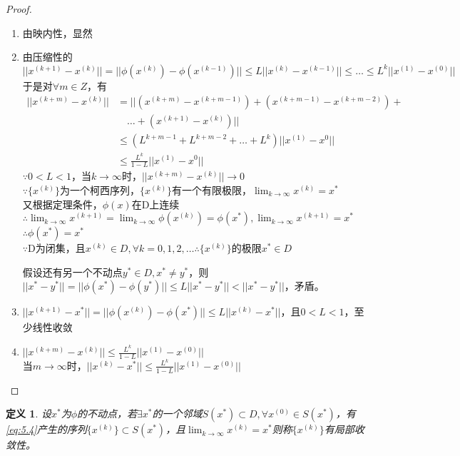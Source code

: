 \documentclass[a4paper]{article}
\newtheorem{definition}{定义}[section]
\begin{document}
\begin{proof}
    \begin{enumerate}
        \item 由映内性，显然
        \item 由压缩性的$||x^{(k+1)}-x^{(k)}||=||\phi(x^{(k)})-\phi(x^{(k-1)})||\le L||x^{(k)}-x^{(k-1)}||\le \dots \le L^k||x^{(1)}-x^{(0)} ||$\\
        于是对$\forall m \in Z$，有
        \begin{equation*}
            \begin{split}
                ||x^{(k+m)}-x^{(k)}|| &= ||(x^{(k+m)}-x^{(k+m-1)})+(x^{(k+m-1)}-x^{(k+m-2)})+\\
                &\quad \dots + (x^{(k+1)}-x^{(k)}) ||\\
                &\le (L^{k+m-1}+L^{k+m-2}+\dots+L^k)||x^{(1)}-x^{0}|| \\
                &\le \frac{L^k}{1-L}||x^{(1)}-x^{0}||
            \end{split}
        \end{equation*}
        $\because 0<L<1$，当$k\rightarrow\infty$时，$||x^{(k+m)}-x^{(k)}||\rightarrow 0$\\
        $\because \{x^{(k)} \}$为一个柯西序列，$\{x^{(k)} \}$有一个有限极限，$\lim_{k\rightarrow\infty}x^{(k)}=x^* $\\
        又根据定理条件，$\phi(x)$在D上连续$\therefore \lim_{k\rightarrow \infty}x^{(k+1)}=\lim_{k\rightarrow \infty}\phi(x^{(k)})=\phi(x^*), \lim_{k\rightarrow \infty}x^{(k+1)}=x^* $\\
        $\therefore \phi(x^*)=x^* $\\
        $\because$D为闭集，且$x^{(k)}\in D, \forall k=0,1,2,\dots \therefore \{x^{(k)} \}$的极限$x^*\in D$

        假设还有另一个不动点$y^*\in D, x^*\neq y^*$，则$||x^*-y^*||=||\phi(x^*)-\phi(y^*) ||\le L||x^*-y^*||<||x^*-y^*||$，矛盾。
        \item $||x^{(k+1)}-x^*||=||\phi(x^{(k)})-\phi(x^*) ||\le L||x^{(k)}-x^*||$，且$0<L<1$，至少线性收敛
        \item $||x^{(k+m)}-x^{(k)}||\le \frac{L^k}{1-L}||x^{(1)}-x^{(0)}||$\\
            当$m\rightarrow\infty$时，$||x^{(k)}-x^*||\le \frac{L^k}{1-L}||x^{(1)}-x^{(0)}||$
    \end{enumerate}
\end{proof}

\begin{definition}
    设$x^*$为$\phi$的不动点，若$\exists x^*$的一个邻域$S(x^*)\subset D, \forall x^{(0)}\in S(x^*) $，有\ref{eq:5.4}产生的序列$\{x^{(k)} \}\subset S(x^*) $，且$\lim_{k\rightarrow\infty}x^{(k)}=x^* $则称$\{x^{(k)} \}$有局部收敛性。
\end{definition}
\end{document}
